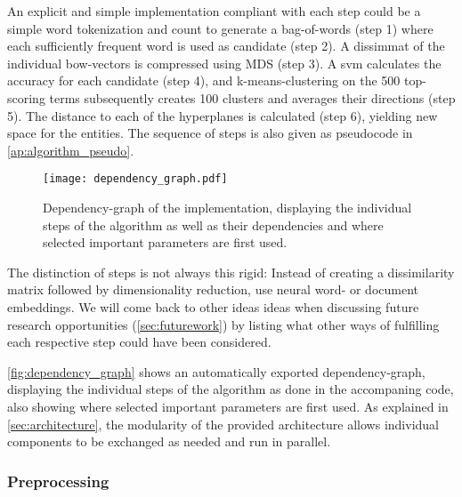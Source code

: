 An explicit and simple implementation compliant with each step could be a simple word tokenization and count to generate a bag-of-words (step 1) where each sufficiently frequent word is used as candidate (step 2). A \gls{dissimmat} of the individual \gls{bow}-vectors is compressed using MDS (step 3). A \gls{svm} calculates the accuracy for each candidate (step 4), and k-means-clustering on the 500 top-scoring terms subsequently creates 100 clusters and averages their directions (step 5). The distance to each of the hyperplanes is calculated (step 6), yielding new space for the entities. The sequence of steps is also given as pseudocode in \autoref{ap:algorithm_pseudo}. 
 

\begin{figure}[H]
	\begin{center}
	  \texttt{[image: dependency\_graph.pdf]}
	  \caption[Dependency-graph of the implementation.]{Dependency-graph of the implementation, displaying the individual steps of the algorithm as well as their dependencies and where selected important parameters are first used.}
	  \label{fig:dependency_graph} %
	\end{center}
\end{figure}

 The distinction of steps is not always this rigid: Instead of creating a dissimilarity matrix followed by dimensionality reduction, \cite{Ager2018,Alshaikh2020} use neural word- or document embeddings. %
 We will come back to other ideas ideas when discussing future research opportunities (\autoref{sec:futurework}) by listing what other ways of fulfilling each respective step could have been considered.

\autoref{fig:dependency_graph} shows an automatically exported dependency-graph, displaying the individual steps of the algorithm as done in the accompaning code, also showing where selected important parameters are first used. As explained in \autoref{sec:architecture}, the modularity of the provided architecture allows individual components to be exchanged as needed and run in parallel.


\subsubsection{Preprocessing}

